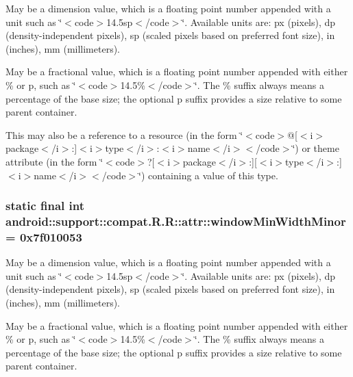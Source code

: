 May be a dimension value, which is a floating point number appended with a unit such as \char`\"{}$<$code$>$14.5sp$<$/code$>$\char`\"{}. Available units are: px (pixels), dp (density-independent pixels), sp (scaled pixels based on preferred font size), in (inches), mm (millimeters). 

May be a fractional value, which is a floating point number appended with either \% or p, such as \char`\"{}$<$code$>$14.5\%$<$/code$>$\char`\"{}. The \% suffix always means a percentage of the base size; the optional p suffix provides a size relative to some parent container. 

This may also be a reference to a resource (in the form \char`\"{}$<$code$>$@\mbox{[}$<$i$>$package$<$/i$>$:\mbox{]}$<$i$>$type$<$/i$>$:$<$i$>$name$<$/i$>$$<$/code$>$\char`\"{}) or theme attribute (in the form \char`\"{}$<$code$>$?\mbox{[}$<$i$>$package$<$/i$>$:\mbox{]}\mbox{[}$<$i$>$type$<$/i$>$:\mbox{]}$<$i$>$name$<$/i$>$$<$/code$>$\char`\"{}) containing a value of this type. \hypertarget{classandroid_1_1support_1_1compat_1_1_r_1_1attr_487d6d3519ee2404229f34a41cdebc44}{
\subsubsection[{windowMinWidthMinor}]{\setlength{\rightskip}{0pt plus 5cm}static final int android::support::compat.R.R::attr::windowMinWidthMinor = 0x7f010053}}
\label{classandroid_1_1support_1_1compat_1_1_r_1_1attr_487d6d3519ee2404229f34a41cdebc44}


May be a dimension value, which is a floating point number appended with a unit such as \char`\"{}$<$code$>$14.5sp$<$/code$>$\char`\"{}. Available units are: px (pixels), dp (density-independent pixels), sp (scaled pixels based on preferred font size), in (inches), mm (millimeters). 

May be a fractional value, which is a floating point number appended with either \% or p, such as \char`\"{}$<$code$>$14.5\%$<$/code$>$\char`\"{}. The \% suffix always means a percentage of the base size; the optional p suffix provides a size relative to some parent container. 

